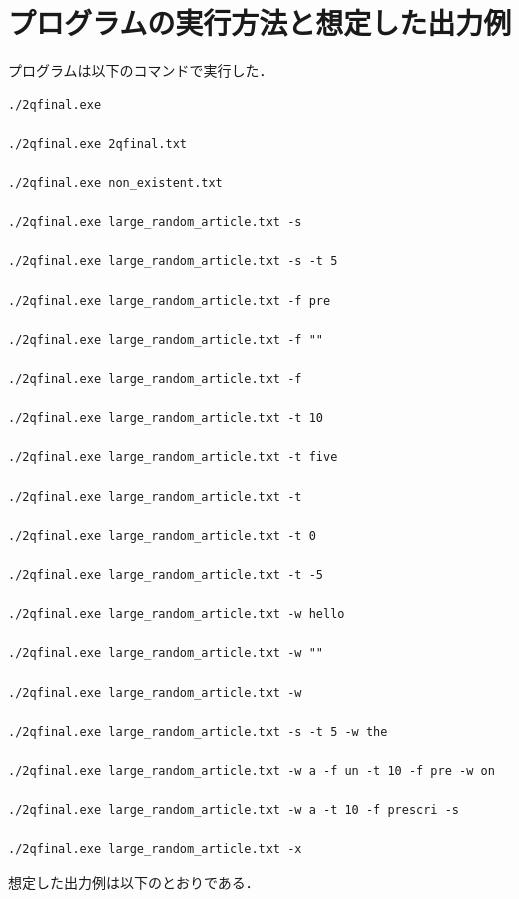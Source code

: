 \documentclass{jsarticle}
\begin{document}
\section{プログラムの実行方法と想定した出力例}
プログラムは以下のコマンドで実行した．
\begin{verbatim}
./2qfinal.exe

./2qfinal.exe 2qfinal.txt

./2qfinal.exe non_existent.txt

./2qfinal.exe large_random_article.txt -s

./2qfinal.exe large_random_article.txt -s -t 5

./2qfinal.exe large_random_article.txt -f pre

./2qfinal.exe large_random_article.txt -f ""

./2qfinal.exe large_random_article.txt -f

./2qfinal.exe large_random_article.txt -t 10

./2qfinal.exe large_random_article.txt -t five

./2qfinal.exe large_random_article.txt -t

./2qfinal.exe large_random_article.txt -t 0

./2qfinal.exe large_random_article.txt -t -5

./2qfinal.exe large_random_article.txt -w hello

./2qfinal.exe large_random_article.txt -w ""

./2qfinal.exe large_random_article.txt -w

./2qfinal.exe large_random_article.txt -s -t 5 -w the

./2qfinal.exe large_random_article.txt -w a -f un -t 10 -f pre -w on

./2qfinal.exe large_random_article.txt -w a -t 10 -f prescri -s

./2qfinal.exe large_random_article.txt -x
\end{verbatim}

想定した出力例は以下のとおりである．
\end{document}
